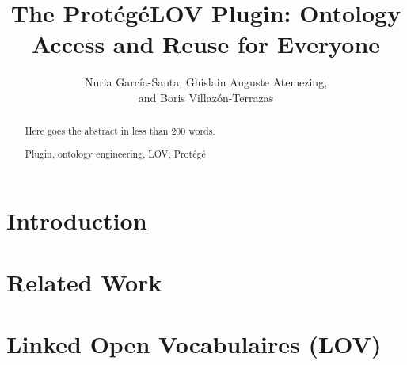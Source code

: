\documentclass[runningheads,a4paper]{llncs}
\newcommand{\keywords}[1]{\par\addvspace\baselineskip
\noindent\keywordname\enspace\ignorespaces#1}
\begin{document}

\title{The Prot{\'e}g{\'e}LOV Plugin: Ontology Access and Reuse for Everyone }


\author{ Nuria Garc\'ia-Santa, Ghislain Auguste Atemezing,\\ and Boris Villaz{\'o}n-Terrazas}


\maketitle


\begin{abstract}
Here goes the abstract in less than 200 words.

\keywords{Plugin, ontology engineering, LOV, Prot{\'e}g{\'e}} 
\end{abstract}


\section{Introduction}\label{sec:introduction}




\section{Related Work}\label{sec:soa}




\section{Linked Open Vocabulaires (LOV)}\label{sec:lov}

\end{document}
